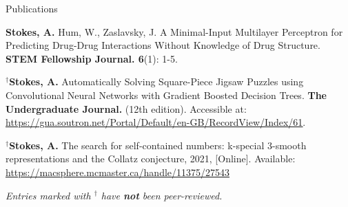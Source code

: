 \begin{rSection}{Publications}
\begin{enumerate}[label={[\arabic*]}]
  \item {\bf Stokes, A.} Hum, W., Zaslavsky, J. A Minimal-Input Multilayer Perceptron for Predicting Drug-Drug Interactions Without Knowledge of Drug Structure. \textbf{STEM Fellowship Journal. 6}(1): 1-5.
  
  \item $^\dagger${\bf Stokes, A.} Automatically Solving Square-Piece Jigsaw Puzzles using Convolutional Neural Networks with Gradient Boosted Decision Trees. \textbf{The Undergraduate Journal.} (12th edition). Accessible at: \underline{\href{https://gua.soutron.net/Portal/Default/en-GB/RecordView/Index/61}{https://gua.soutron.net/Portal/Default/en-GB/RecordView/Index/61}}.
  \item $^\dagger${\bf Stokes, A.} The search for self-contained numbers: k-special 3-smooth representations and the Collatz conjecture, 2021, [Online]. Available: \underline{\href{https://macsphere.mcmaster.ca/handle/11375/27543}{https://macsphere.mcmaster.ca/handle/11375/27543}}

\end{enumerate}

\smallskip
{\em Entries marked with $^\dagger$ have \textbf{not} been peer-reviewed.}

\end{rSection}
